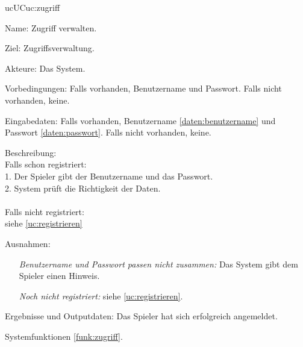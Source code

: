 \begin{description}[leftmargin=5em, style=sameline]

	\begin{lhp}{uc}{UC}{uc:zugriff}
		\item [Name:] Zugriff verwalten.
		\item [Ziel:] Zugriffsverwaltung.
		\item [Akteure:] Das System.
		\item [Vorbedingungen:] Falls vorhanden, Benutzername und Passwort. Falls nicht vorhanden, keine.
		\item [Eingabedaten:] Falls vorhanden, Benutzername \ref{daten:benutzername} und Passwort \ref{daten:passwort}. Falls nicht vorhanden, keine.
		\item [Beschreibung:] \hfill\\ Falls schon registriert:\hfill\\
		1. Der Spieler gibt der Benutzername und das Passwort.\\
		2. System prüft die Richtigkeit der Daten.\\
		\hfill\\ Falls nicht registriert:\hfill\\
		siehe \ref{uc:registrieren}
		\item [Ausnahmen:] \hfill
		\begin{itemize} 
		\item[] \textit{Benutzername und Passwort passen nicht zusammen:} Das System gibt dem Spieler einen Hinweis.				\item[] \textit{Noch nicht registriert:} siehe \ref{uc:registrieren}.
		
	\end{itemize}
	
		\item [Ergebnisse und Outputdaten:] Das Spieler hat sich erfolgreich angemeldet.
		\item [Systemfunktionen] \ref{funk:zugriff}.
	\end{lhp}


\end{description}
